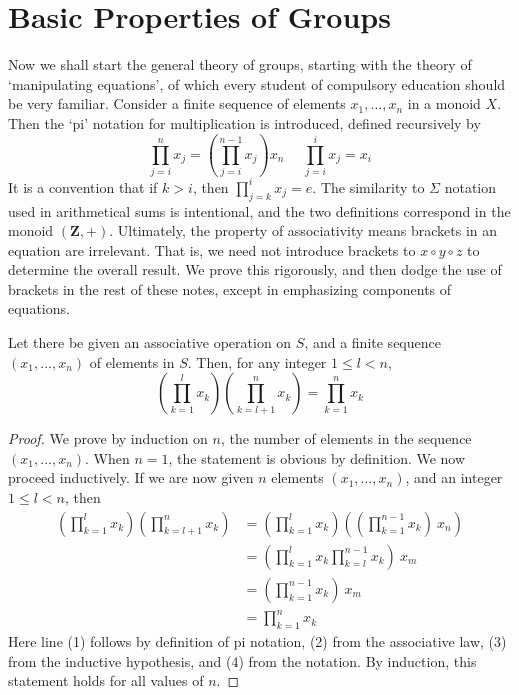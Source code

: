 \section{Basic Properties of Groups}

Now we shall start the general theory of groups, starting with the theory of `manipulating equations', of which every student of compulsory education should be very familiar. Consider a finite sequence of elements $x_1, \dots, x_n$ in a monoid $X$. Then the `pi' notation for multiplication is introduced, defined recursively by
%
\[ \prod_{j = i}^n x_j = \left( \prod_{j = i}^{n-1} x_j \right) x_n\ \ \ \ \ \ \prod_{j = i}^i x_j = x_i \]
%
It is a convention that if $k > i$, then $\prod_{j = k}^i x_j = e$. The similarity to $\Sigma$ notation used in arithmetical sums is intentional, and the two definitions correspond in the monoid $(\mathbf{Z}, +)$. Ultimately, the property of associativity means brackets in an equation are irrelevant. That is, we need not introduce brackets to $x \circ y \circ z$ to determine the overall result. We prove this rigorously, and then dodge the use of brackets in the rest of these notes, except in emphasizing components of equations.

\begin{theorem}
Let there be given an associative operation on $S$, and a finite sequence $(x_1, \dots, x_n)$ of elements in $S$. Then, for any integer $1 \leq l < n$,
%
\[ \left( \prod_{k=1}^l x_k \right) \left( \prod_{k=l+1}^n x_k \right) = \prod_{k=1}^n x_k \]
\end{theorem}
\begin{proof}
    We prove by induction on $n$, the number of elements in the sequence $(x_1, \dots, x_n)$. When $n = 1$, the statement is obvious by definition. We now proceed inductively. If we are now given $n$ elements $(x_1, \dots, x_n)$, and an integer $1 \leq l < n$, then
    \begin{align*}
        \left( \prod_{k=1}^l x_k \right) \left( \prod_{k=l+1}^n x_k \right) &= \left( \prod_{k=1}^l x_k \right) \left( \left( \prod_{k=1}^{n-1} x_k \right)\ x_n \right)\\
        &= \left( \prod_{k=1}^l x_k \prod_{k=l}^{n-1} x_k \right)\ x_m\\
        &= \left( \prod_{k=1}^{n-1} x_k \right)\ x_m\\
        &= \prod_{k=1}^n x_k
    \end{align*}
    Here line (1) follows by definition of pi notation, (2) from the associative law, (3) from the inductive hypothesis, and (4) from the notation. By induction, this statement holds for all values of $n$.
\end{proof}

